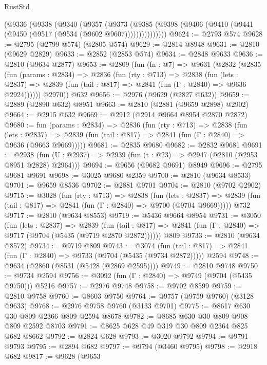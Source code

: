 \begin{lexlean}{RustStd}
\begin{coremodule}
      (@9336
        (@9338
          (@9340
            (@9357
              (@9373
                (@9385 (@9398 (@9406 (@9410 (@9441 (@9450 (@9517 (@9534 (@9602 @9607)))))))))))))))
@9624 := @2793 @574
@9628 := @2795 (@2799 @574) (@2805 @574)
@9629 := @2814 @8948
@9631 := @2810 (@9629 @2829)
@9633 := @2852 (@2853 @574)
@9634 := @2848 @9633
@9636 := @2810 (@9634 @2877)
@9653 := @2809
    (fun (fn : @7) =>
    @9631
      (@2832
        (@2835
          (fun (params : @2834) =>
          @2836
            (fun (rty : @713) =>
            @2838
              (fun (lets : @2837) =>
              @2839 (fun (tail : @817) => @2841 (fun (Γ : @2840) => @9636 @2924))))))
        @2970))
    @632
@9656 := @2976 (@9629 (@2827 @632))
@9659 := @2889 (@2890 @632) @8951
@9663 := @2810 (@2881 (@9659 @2898) @2902)
@9664 := @2915 @632
@9669 := @2912 (@2914 @9664 @8954 @2870 @2872)
@9680 := fun (params : @2834) =>
  @2836
    (fun (rty : @713) =>
    @2838
      (fun (lets : @2837) =>
      @2839 (fun (tail : @817) => @2841 (fun (Γ : @2840) => @9636 (@9663 @9669)))))
@9681 := @2835 @9680
@9682 := @2832 @9681
@9691 := @2938 (fun (U : @2937) => @2939 (fun (t : @23) => @2947 (@2810 (@2953 @8951 @2828) @2964)))
@9694 := @9656 (@9682 @9691) @8949
@9696 := @2795 @9681 @9691
@9698 := @3025 @9680 @2359
@9700 := @2810 (@9634 @8533)
@9701 := @9659 @8536
@9702 := @2881 @9701
@9704 := @2810 (@9702 @2902)
@9715 := @3028
    (fun (rty : @713) =>
    @2838
      (fun (lets : @2837) =>
      @2839 (fun (tail : @817) => @2841 (fun (Γ : @2840) => @9700 (@9704 @9669)))))
    @732
@9717 := @2810 (@9634 @8553)
@9719 := @5436 @9664 @8954
@9731 := @3050
    (fun (lets : @2837) =>
    @2839
      (fun (tail : @817) => @2841 (fun (Γ : @2840) => @9717 (@9704 (@5435 (@9719 @2870 @2872))))))
    @809
@9733 := @2810 (@9634 @8572)
@9734 := @9719 @809
@9743 := @3074
    (fun (tail : @817) => @2841 (fun (Γ : @2840) => @9733 (@9704 (@5435 (@9734 @2872)))))
    @2594
@9748 := @9634 (@2860 (@8531 (@5428 (@2869 @2595))))
@9749 := @2810 @9748
@9750 := @9734 @2594
@9756 := @3092 (fun (Γ : @2840) => @9749 (@9704 (@5435 @9750))) @5216
@9757 := @2976 @9748
@9758 := @9702 @8599
@9759 := @2810 @9758
@9760 := @8603 @9750
@9764 := @9757 (@9759 @9760) (@3128 @9633)
@9768 := @2976 @9758 @9760 (@3133 @9701)
@9775 := @8617 @630 @30 @809 @2366 @809 @2594 @8678
@9782 := @8685 @630 @30 @809 @908 @809 @2592 @8703
@9791 := @8625 @628 @49 @319 @30 @809 @2364 @825 @682 @8662
@9792 := @2824 @628
@9793 := @3020 @9792
@9794 := @9791 @9793
@9795 := @2894 @682
@9797 := @9794 (@3460 @9795)
@9798 := @2918 @682
@9817 := @9628
    (@9653

\end{coremodule}
\end{lexlean}
